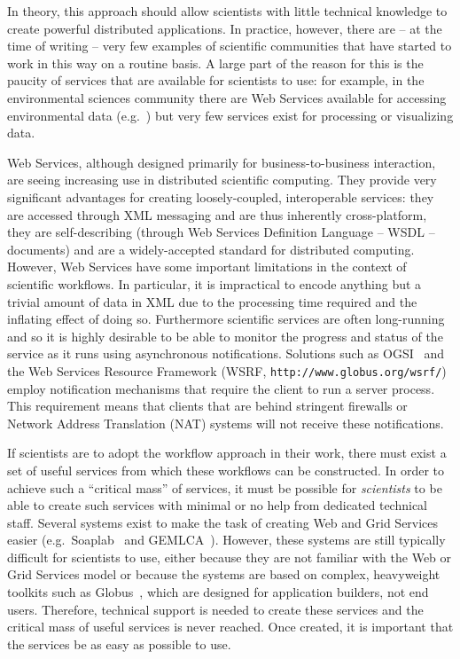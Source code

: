 \documentclass{llncs}
\begin{document}
In theory, this approach should allow scientists with little technical knowledge to create powerful distributed applications.  In practice, however, there are -- at the time of writing -- very few examples of scientific communities that have started to work in this way on a routine basis.  A large part of the reason for this is the paucity of services that are available for scientists to use: for example, in the environmental sciences community there are Web Services available for accessing environmental data (e.g.\ \cite{Woolf:2003}) but very few services exist for processing or visualizing data.

Web Services, although designed primarily for business-to-business interaction, are seeing increasing use in distributed scientific computing.  They provide very significant advantages for creating loosely-coupled, interoperable services: they are accessed through XML messaging and are thus inherently cross-platform, they are self-describing (through Web Services Definition Language -- WSDL -- documents) and are a widely-accepted standard for distributed computing.  However, Web Services have some important limitations in the context of scientific workflows. In particular, it is impractical to encode anything but a trivial amount of data in XML due to the processing time required and the inflating effect of doing so. Furthermore scientific services are often long-running and so it is highly desirable to be able to monitor the progress and status of the service as it runs using asynchronous notifications. Solutions such as OGSI~\cite{ogsi} and the Web Services Resource Framework (WSRF, {\tt http://www.globus.org/wsrf/}) employ notification mechanisms that require the client to run a server process. This requirement means that clients that are behind stringent firewalls or Network Address Translation (NAT) systems will not receive these notifications.

If scientists are to adopt the workflow approach in their work, there must exist a set of useful services from which these workflows can be constructed.  In order to achieve such a ``critical mass'' of services, it must be possible for {\em scientists\/} to be able to create such services with minimal or no help from dedicated technical staff.  Several systems exist to make the task of creating Web and Grid Services easier (e.g.\ Soaplab~\cite{soaplab} and GEMLCA~\cite{gemlca}).  However, these systems are still typically difficult for scientists to use, either because they are not familiar with the Web or Grid Services model or because the systems are based on complex, heavyweight toolkits such as Globus~\cite{globustoolkit}, which are designed for application builders, not end users.  Therefore, technical support is needed to create these services and the critical mass of useful services is never reached.  Once created, it is important that the services be as easy as possible to use.
\end{document}
